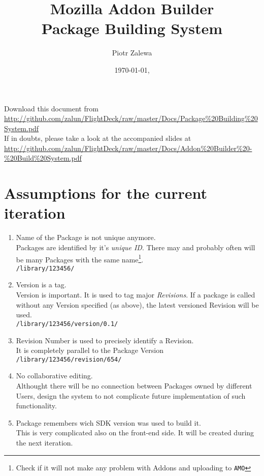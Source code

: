 \documentclass[10pt]{article}
\title{Mozilla Addon Builder\\ Package Building System}
\author{Piotr Zalewa}
\date{\today, \version}
\def\amo{{\tt AMO}}
\begin{document}
\maketitle

{\scriptsize
	\noindent Download this document from \\
\url{http://github.com/zalun/FlightDeck/raw/master/Docs/Package%20Building\%20System.pdf}\\
}{\scriptsize
	\noindent If in doubts, please take a look at the accompanied slides at \\
	\url{http://github.com/zalun/FlightDeck/raw/master/Docs/Addon\%20Builder\%20-\%20Build\%20System.pdf}
}

\section{Assumptions for the current iteration}

	\begin{enumerate}
		\item{Name of the Package is not unique anymore.\\
			Packages are identified by it's {\em unique ID}. There may and probably often will be many
			Packages with the same name\footnote{Check if it will not make any problem with Addons and 
			uploading to \amo}.\\
			{\tt /library/123456/}}
		\item{Version is a tag.\\
			Version is important. It is used to tag major {\em Revisions}. If a package is called without any
			Version specified (as above), the latest versioned Revision will be used.\\
			{\tt /library/123456/version/0.1/}}
		\item{Revision Number is used to precisely identify a Revision.\\
			It is completely parallel to the Package Version\\
			{\tt /library/123456/revision/654/}}
		\item{No collaborative editing.\\
			Althought there will be no connection between Packages owned by different Users, design the 
			system to not complicate future implementation of such functionality.}
		\item{Package remembers wich SDK version was used to build it.\\
			This is very complicated also on the front-end side. It will be created during the next
			iteration.}
	\end{enumerate}
\end{document}
